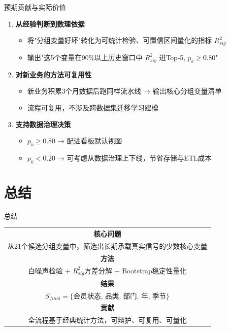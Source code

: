 \documentclass{beamer}
\begin{document}
\begin{frame}{预期贡献与实际价值}
    \begin{enumerate}
        \item \textbf{从经验判断到数理依据}
        \begin{itemize}
            \item 将"分组变量好坏"转化为可统计检验、可置信区间量化的指标 $R^2_{sig}$
            \item 输出"这5个变量在90\%以上历史窗口中 $R^2_{sig}$ 进Top-5, $p_k \geq 0.80$"
        \end{itemize}
        
        \item \textbf{对新业务的方法可复用性}
        \begin{itemize}
            \item 新业务积累3个月数据后跑同样流水线 → 输出核心分组变量清单
            \item 流程可复用，不涉及跨数据集迁移学习建模
        \end{itemize}
        
        \item \textbf{支持数据治理决策}
        \begin{itemize}
            \item $p_k \geq 0.80$ → 配进看板默认视图
            \item $p_k < 0.20$ → 可考虑从数据治理上下线，节省存储与ETL成本
        \end{itemize}
    \end{enumerate}
\end{frame}

\section{总结}

\begin{frame}{总结}
    \begin{center}
        \Large
        \begin{tabular}{c}
            \toprule
            \textbf{核心问题} \\
            从21个候选分组变量中，筛选出长期承载真实信号的少数核心变量 \\
            \midrule
            \textbf{方法} \\
            白噪声检验 + $R^2_{sig}$方差分解 + Bootstrap稳定性量化 \\
            \midrule
            \textbf{结果} \\
            $S_{final} = \{\text{会员状态, 品类, 部门, 年, 季节}\}$ \\
            \midrule
            \textbf{贡献} \\
            全流程基于经典统计方法，可辩护、可复用、可量化 \\
            \bottomrule
        \end{tabular}
    \end{center}
\end{frame}
\end{document}
